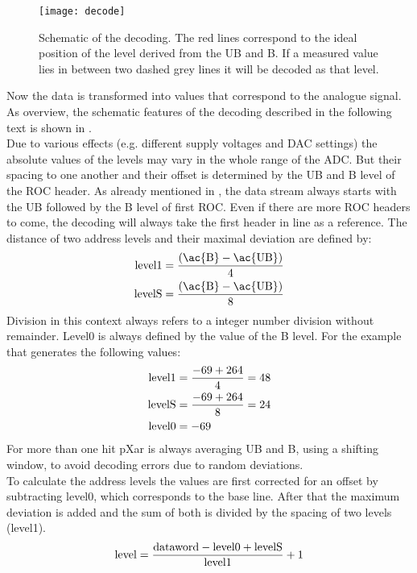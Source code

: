 \begin{figure}[ht]
	\vspace*{-10pt}
	\centering
	\texttt{[image: decode]}
	\caption{Schematic of the decoding. The red lines correspond to the ideal position of the level derived from the \ac{UB} and \ac{B}. If a measured value lies in between two dashed grey lines it will be decoded as that level.}
	\label{p15}
\end{figure}
Now the data is transformed into values that correspond to the analogue signal. As overview, the schematic features of the decoding described in the following text is shown in .\\
Due to various effects (e.g. different supply voltages and \ac{DAC} settings) the absolute values of the levels may vary in the whole range of the \ac{ADC}. But their spacing to one another and their offset is determined by the \ac{UB} and \ac{B} level of the \ac{ROC} header. As already mentioned in , the data stream always starts with the \ac{UB} followed by the \ac{B} level of first \ac{ROC}. Even if there are more \ac{ROC} headers to come, the decoding will always take the first header in line as a reference. The distance of two address levels and their maximal deviation are defined by:
\begin{align}
	\z{level}1 &= \frac{\left( \z{\ac{B}} - \z{\ac{UB}} \right)}{4}\\
	\z{levelS} &= \frac{\left( \z{\ac{B}} - \z{\ac{UB}} \right)}{8}
\end{align}
Division in this context always refers to a integer number division without remainder. Level$0$ is always defined by the value of the \ac{B} level. For the example that generates the following values:
\begin{align*}
	\text{level}1 &= \frac{-69+264}{4} = 48\\
	\text{levelS} &= \frac{-69+264}{8} = 24\\
	\text{level}0 &= -69
\end{align*}
For more than one hit pXar is always averaging \ac{UB} and \ac{B}, using a shifting window, to avoid decoding errors due to random deviations.\\
To calculate the address levels the values are first corrected for an offset by subtracting level$0$, which corresponds to the base line. After that the maximum deviation is added and the sum of both is divided by the spacing of two levels (level1).
\begin{equation}
	\text{level} = \frac{\text{dataword} - \text{level}0 + \text{levelS}}{\text{level}1} + 1
\end{equation}
